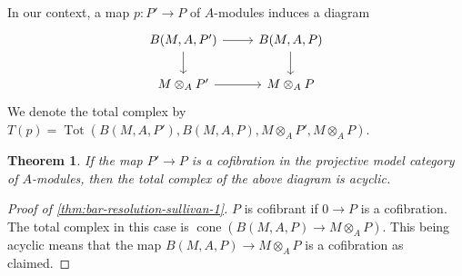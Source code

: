 \documentclass{scrartcl}
\theoremstyle{plain}
\newtheorem{theorem}{Theorem}[section]
\theoremstyle{definition}
\DeclareMathOperator{\Tot}{Tot}
\DeclareMathOperator{\cone}{cone}
\begin{document}
In our context, a map $p\colon P'\to P$ of $A$-modules induces a diagram 
\[\begin{tikzcd}\label{diag:bar-relative-tensor-comparison}
    B(M, A, P') \dar \rar & B(M, A, P)\dar \\
    M\otimes_A P' \rar & M\otimes_A P
\end{tikzcd}\]
We denote the total complex by $T(p) = \Tot(B(M, A, P'), B(M, A, P), M\otimes_A P',  M\otimes_A P)$.

\begin{theorem}\label{thm:bar-construction-totalization}
    If the map $P'\to P$ is a cofibration in the projective model category of $A$-modules, then the total complex of the above diagram is acyclic.
\end{theorem}
\begin{proof}[Proof of \cref{thm:bar-resolution-sullivan-1}]
$P$ is cofibrant if $0\to P$ is a cofibration. The total complex in this case is $\cone(B(M, A, P) \to M\otimes_A P)$. This being acyclic means that the map $B(M, A, P)\to M\otimes_A P$ is a cofibration as claimed.
\end{proof}
\end{document}

